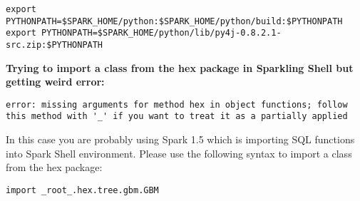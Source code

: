 \begin{lstlisting}[style=Bash]
export PYTHONPATH=$SPARK_HOME/python:$SPARK_HOME/python/build:$PYTHONPATH
export PYTHONPATH=$SPARK_HOME/python/lib/py4j-0.8.2.1-src.zip:$PYTHONPATH
\end{lstlisting}

\textbf{Trying to import a class from the hex package in Sparkling Shell but getting weird error:}

\begin{lstlisting}[style=Bash]
error: missing arguments for method hex in object functions; follow this method with '_' if you want to treat it as a partially applied
\end{lstlisting}

In this case you are probably using Spark 1.5 which is importing SQL functions into Spark Shell environment. Please use the following syntax to import a class from the hex package:
\begin{lstlisting}[style=Bash]
import _root_.hex.tree.gbm.GBM
\end{lstlisting}




